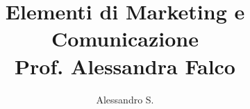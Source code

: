 

\title{Elementi di Marketing e Comunicazione \\
\small{Prof. Alessandra Falco}}

\author{Alessandro S.}



\maketitle
\tableofcontents
\clearpage











